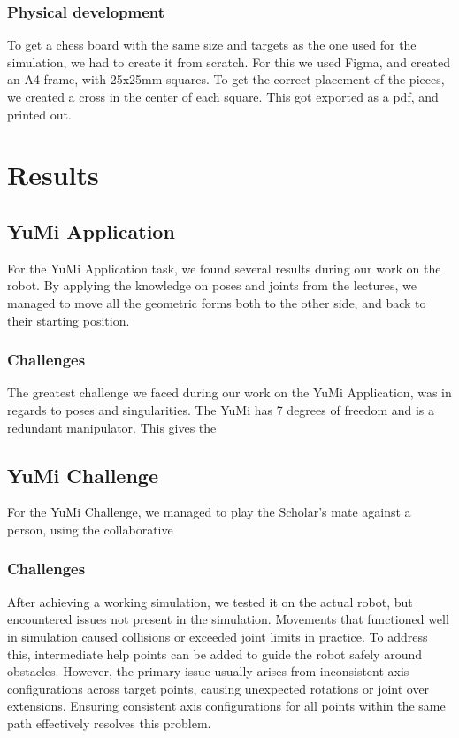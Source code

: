 \documentclass[a4paper,12pt]{article}
\begin{document}
\subsubsection{Physical development}
To get a chess board with the same size and targets as the one used for the simulation, we had to create it from scratch. For this we used Figma, and created an A4 frame, with 25x25mm squares. To get the correct placement of the pieces, we created a cross in the center of each square. This got exported as a pdf, and printed out. 

\section{Results}
\subsection{YuMi Application}
For the YuMi Application task, we found several results during our work on the robot. By applying the knowledge on poses and joints from the lectures, we managed to move all the geometric forms both to the other side, and back to their starting position. 

\subsubsection{Challenges}
The greatest challenge we faced during our work on the YuMi Application, was in regards to poses and singularities. 
The YuMi has 7 degrees of freedom and is a redundant manipulator. This gives the 

\subsection{YuMi Challenge}
For the YuMi Challenge, we managed to play the Scholar's mate against a person, using the collaborative 
\subsubsection{Challenges}

After achieving a working simulation, we tested it on the actual robot, but encountered issues not present in the simulation. Movements that functioned well in simulation caused collisions or exceeded joint limits in practice. To address this, intermediate help points can be added to guide the robot safely around obstacles. However, the primary issue usually arises from inconsistent axis configurations across target points, causing unexpected rotations or joint over extensions. Ensuring consistent axis configurations for all points within the same path effectively resolves this problem.
\end{document}
